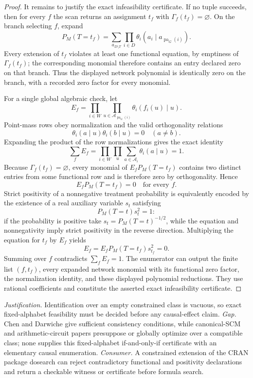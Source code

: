 \documentclass{article}
\begin{document}
\begin{proof}
It remains to justify the exact infeasibility certificate.  If no tuple succeeds, then for every \(f\) the scan returns an assignment \(t_f\) with \(\Gamma_f(t_f)=\varnothing\).  On the branch selecting \(f\), expand
\[
 P_M(T=t_f)
 =\sum_{a_{D\setminus T}}
   \prod_{i\in D}
   \theta_i(a_i\mid a_{\operatorname{pa}_G(i)}).
\]
Every extension of \(t_f\) violates at least one functional equation, by emptiness of \(\Gamma_f(t_f)\); the corresponding monomial therefore contains an entry declared zero on that branch.  Thus the displayed network polynomial is identically zero on the branch, with a recorded zero factor for every monomial.

For a single global algebraic check, let
\[
 E_f=\prod_{i\in W}\prod_{u\in
 \mathcal A_{\operatorname{pa}_G(i)}}
 \theta_i(f_i(u)\mid u).
\]
Point-mass rows obey normalization and the valid orthogonality relations
\[
 \theta_i(a\mid u)\theta_i(b\mid u)=0
 \quad(a\ne b).
\]
Expanding the product of the row normalizations gives the exact identity
\[
 \sum_f E_f
 =\prod_{i\in W}\prod_u\sum_{a\in\mathcal A_i}
   \theta_i(a\mid u)=1.
\]
Because \(\Gamma_f(t_f)=\varnothing\), every monomial of
\(E_fP_M(T=t_f)\) contains two distinct entries from some functional row and is therefore zero by orthogonality.  Hence
\[
 E_fP_M(T=t_f)=0
 \quad\text{for every }f.
\]
Strict positivity of a nonnegative treatment probability is equivalently encoded by the existence of a real auxiliary variable \(s_t\) satisfying
\[
 P_M(T=t)s_t^2=1:
\]
if the probability is positive take \(s_t=P_M(T=t)^{-1/2}\), while the equation and nonnegativity imply strict positivity in the reverse direction.  Multiplying the equation for \(t_f\) by \(E_f\) yields
\[
 E_f=E_fP_M(T=t_f)s_{t_f}^2=0.
\]
Summing over \(f\) contradicts \(\sum_fE_f=1\).  The enumerator can output the finite list \((f,t_f)\), every expanded network monomial with its functional zero factor, the normalization identity, and these displayed polynomial reductions.  They use rational coefficients and constitute the asserted exact infeasibility certificate.
\end{proof}
\par\smallskip\noindent \textit{Justification.} Identification over an empty constrained class is vacuous, so exact fixed-alphabet feasibility must be decided before any causal-effect claim. \textit{Gap.} Chen and Darwiche give sufficient consistency conditions, while canonical-SCM and arithmetic-circuit papers presuppose or globally optimize over a compatible class; none supplies this fixed-alphabet if-and-only-if certificate with an elementary causal enumeration. \textit{Consumer.} A constrained extension of the CRAN package dosearch can reject contradictory functional and positivity declarations and return a checkable witness or certificate before formula search.
\end{document}
